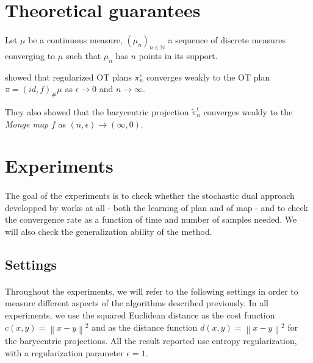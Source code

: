 \documentclass[a4paper,11pt]{article}
\newcommand{\N}{\mathbb{N}}
\newcommand{\1}{\mathbbm{1}}
\newcommand{\norm}[1]{\left\|#1\right\|}
\begin{document}
\section{Theoretical guarantees}
\label{sec:theoretical_guarantees}

\paragraph{}Let $\mu$ be a continuous measure, $(\mu_n)_{n \in \N}$ a sequence of discrete measures converging to $\mu$ such that $\mu_n$ has $n$ points in its support.

\citet{seguy2018largescaleoptimaltransportmapping} showed that regularized OT plans $\pi_n^{\epsilon}$ converges weakly to the OT plan $\pi = (id, f)_{\#}\mu$ \citep{brenier1991polar} as $\epsilon \rightarrow 0$ and $n \rightarrow \infty$.

They also showed that the barycentric projection $\widetilde{\pi}_n^{\epsilon}$ converges weakly to the \emph{Monge map} $f$ as $(n, \epsilon) \rightarrow (\infty, 0)$.

\section{Experiments}
\label{sec:experiments}

\paragraph{}The goal of the experiments is to check whether the stochastic dual approach developped by \citet{seguy2018largescaleoptimaltransportmapping} works at all - both the learning of plan and of map - and to check the convergence rate as a function of time and number of samples needed. We will also check the generalization ability of the method.

\subsection{Settings}

\paragraph{}Throughout the experiments, we will refer to the following settings in order to measure different aspects of the algorithms described previously. In all experiments, we use the squared Euclidean distance as the cost function $c(x, y) = \norm{x - y}^2$ and as the distance function $d(x, y) = \norm{x - y}^2$ for the barycentric projections. All the result reported use entropy regularization, with a regularization parameter $\epsilon = 1$.
\end{document}
